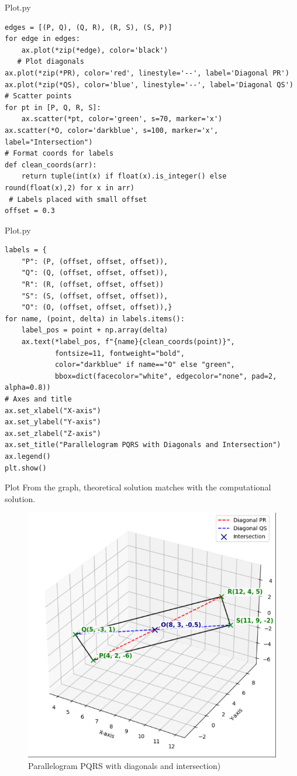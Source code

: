 \documentclass{beamer}
\begin{document}
\begin{frame}[fragile]{Plot.py}
\begin{lstlisting}
edges = [(P, Q), (Q, R), (R, S), (S, P)]
for edge in edges:
    ax.plot(*zip(*edge), color='black')
   # Plot diagonals
ax.plot(*zip(*PR), color='red', linestyle='--', label='Diagonal PR')
ax.plot(*zip(*QS), color='blue', linestyle='--', label='Diagonal QS')
# Scatter points
for pt in [P, Q, R, S]:
    ax.scatter(*pt, color='green', s=70, marker='x')
ax.scatter(*O, color='darkblue', s=100, marker='x', label="Intersection")
# Format coords for labels
def clean_coords(arr):
    return tuple(int(x) if float(x).is_integer() else round(float(x),2) for x in arr)
 # Labels placed with small offset
offset = 0.3
\end{lstlisting}
\end{frame}

\begin{frame}[fragile]{Plot.py}
\begin{lstlisting}
labels = {
    "P": (P, (offset, offset, offset)),
    "Q": (Q, (offset, offset, offset)),
    "R": (R, (offset, offset, offset))
    "S": (S, (offset, offset, offset)),
    "O": (O, (offset, offset, offset)),}
for name, (point, delta) in labels.items():
    label_pos = point + np.array(delta)
    ax.text(*label_pos, f"{name}{clean_coords(point)}",
            fontsize=11, fontweight="bold",
            color="darkblue" if name=="O" else "green",
            bbox=dict(facecolor="white", edgecolor="none", pad=2, alpha=0.8))
# Axes and title
ax.set_xlabel("X-axis")
ax.set_ylabel("Y-axis")
ax.set_zlabel("Z-axis")
ax.set_title("Parallelogram PQRS with Diagonals and Intersection")
ax.legend()
plt.show()
\end{lstlisting}
\end{frame}

\begin{frame}{Plot}
From the graph, theoretical solution matches with the computational solution.

\begin{figure}[H]
\centering
\includegraphics[width=0.5\columnwidth]{figs/graph.png}
\caption*{Parallelogram PQRS with diagonals and intersection)}
\label{fig:graph.png}
\end{figure}

    
\end{frame}
\end{document}
